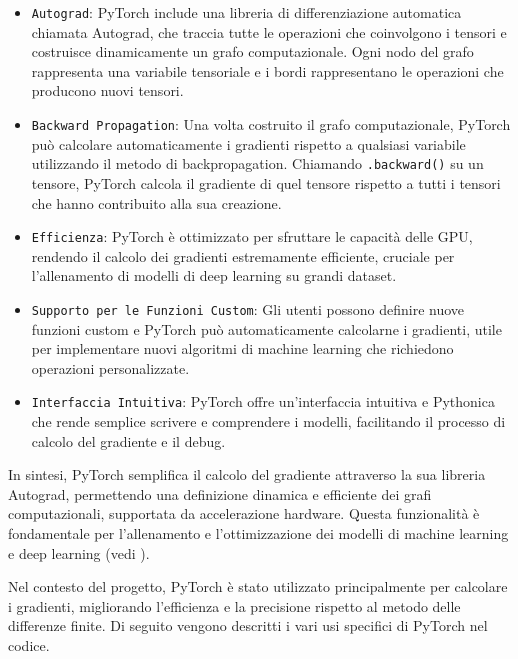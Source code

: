 \documentclass[twoside]{article}
\begin{document}
\begin{itemize}
    \item \verb|Autograd|: PyTorch include una libreria di differenziazione automatica chiamata Autograd, che traccia tutte le operazioni che coinvolgono i tensori e costruisce dinamicamente un grafo computazionale. Ogni nodo del grafo rappresenta una variabile tensoriale e i bordi rappresentano le operazioni che producono nuovi tensori.
    \item \verb|Backward Propagation|: Una volta costruito il grafo computazionale, PyTorch può calcolare automaticamente i gradienti rispetto a qualsiasi variabile utilizzando il metodo di backpropagation. Chiamando \texttt{.backward()} su un tensore, PyTorch calcola il gradiente di quel tensore rispetto a tutti i tensori che hanno contribuito alla sua creazione.
    \item \verb|Efficienza|: PyTorch è ottimizzato per sfruttare le capacità delle GPU, rendendo il calcolo dei gradienti estremamente efficiente, cruciale per l'allenamento di modelli di deep learning su grandi dataset.
    \item \verb|Supporto per le Funzioni Custom|: Gli utenti possono definire nuove funzioni custom e PyTorch può automaticamente calcolarne i gradienti, utile per implementare nuovi algoritmi di machine learning che richiedono operazioni personalizzate.
    \item \verb|Interfaccia Intuitiva|: PyTorch offre un'interfaccia intuitiva e Pythonica che rende semplice scrivere e comprendere i modelli, facilitando il processo di calcolo del gradiente e il debug.
\end{itemize}

In sintesi, PyTorch semplifica il calcolo del gradiente attraverso la sua libreria Autograd, permettendo una definizione dinamica e efficiente dei grafi computazionali, supportata da accelerazione hardware. Questa funzionalità è fondamentale per l'allenamento e l'ottimizzazione dei modelli di machine learning e deep learning (vedi \cite{PyTorch}).

\vspace{\baselineskip}

Nel contesto del progetto, PyTorch è stato utilizzato principalmente per calcolare i gradienti, migliorando l'efficienza e la precisione rispetto al metodo delle differenze finite. Di seguito vengono descritti i vari usi specifici di PyTorch nel codice.
\end{document}
